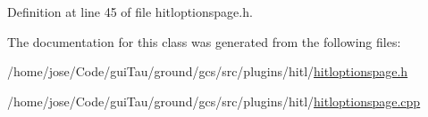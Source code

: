 Definition at line 45 of file hitloptionspage.\-h.



The documentation for this class was generated from the following files\-:\begin{DoxyCompactItemize}
\item 
/home/jose/\-Code/gui\-Tau/ground/gcs/src/plugins/hitl/\hyperlink{hitloptionspage_8h}{hitloptionspage.\-h}\item 
/home/jose/\-Code/gui\-Tau/ground/gcs/src/plugins/hitl/\hyperlink{hitloptionspage_8cpp}{hitloptionspage.\-cpp}\end{DoxyCompactItemize}
